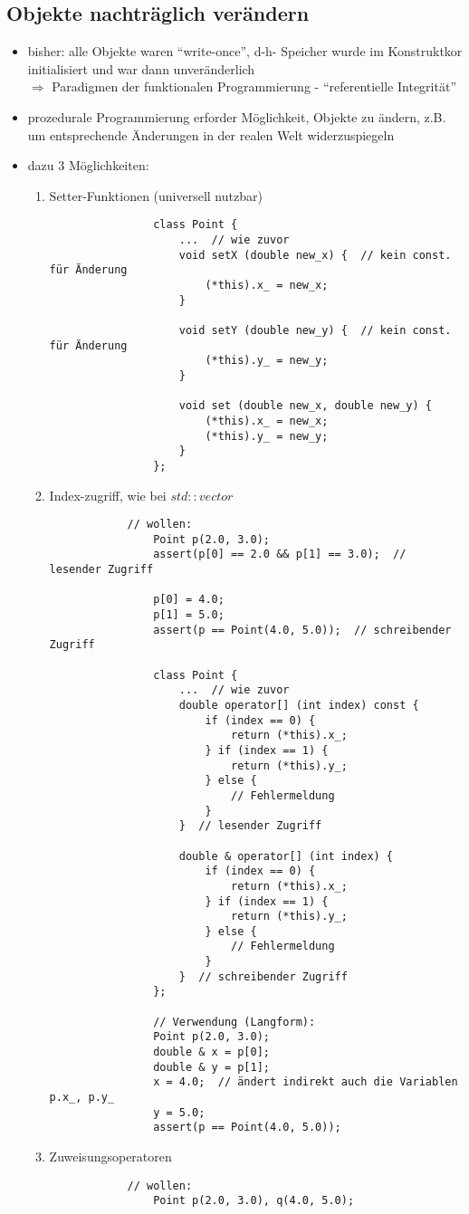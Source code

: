 \documentclass{article}
\begin{document}
\subsection{Objekte nachträglich verändern}
	\begin{itemize}
		\item bisher: alle Objekte waren ``write-once'', d-h- Speicher wurde im Konstruktkor initialisiert und war dann unveränderlich \\ $\Rightarrow $ Paradigmen der funktionalen Programmierung - ``referentielle Integrität''
		\item prozedurale Programmierung erforder Möglichkeit, Objekte zu ändern, z.B. um entsprechende Änderungen in der realen Welt widerzuspiegeln
		\item dazu 3 Möglichkeiten:
		\begin{enumerate}
			\item Setter-Funktionen (universell nutzbar)
			\begin{lstlisting}
				class Point {
					...  // wie zuvor
					void setX (double new_x) {  // kein const. für Änderung
						(*this).x_ = new_x;
					}

					void setY (double new_y) {  // kein const. für Änderung
						(*this).y_ = new_y;
					}

					void set (double new_x, double new_y) {
						(*this).x_ = new_x;
						(*this).y_ = new_y;
					}
				};
			\end{lstlisting}
			\item Index-zugriff, wie bei $std::vector$
			\begin{lstlisting}
			// wollen:
				Point p(2.0, 3.0);
				assert(p[0] == 2.0 && p[1] == 3.0);  // lesender Zugriff

				p[0] = 4.0;
				p[1] = 5.0;
				assert(p == Point(4.0, 5.0));  // schreibender Zugriff

				class Point {
					...  // wie zuvor
					double operator[] (int index) const {
						if (index == 0) {
							return (*this).x_;
						} if (index == 1) {
							return (*this).y_;
						} else {
							// Fehlermeldung
						}
					}  // lesender Zugriff

					double & operator[] (int index) {
						if (index == 0) {
							return (*this).x_;
						} if (index == 1) {
							return (*this).y_;
						} else {
							// Fehlermeldung
						}
					}  // schreibender Zugriff
				};

				// Verwendung (Langform):
				Point p(2.0, 3.0);
				double & x = p[0];  
				double & y = p[1];
				x = 4.0;  // ändert indirekt auch die Variablen p.x_, p.y_
				y = 5.0;
				assert(p == Point(4.0, 5.0));
			\end{lstlisting}
			\item Zuweisungsoperatoren
			\begin{lstlisting}
			// wollen:
				Point p(2.0, 3.0), q(4.0, 5.0);


\end{lstlisting}
\end{enumerate}
\end{itemize}
\end{document}
